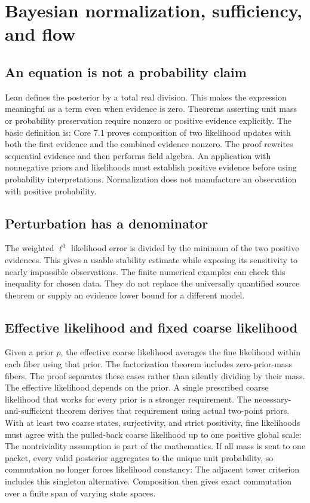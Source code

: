 \clearpage\section{Bayesian normalization, sufficiency, and flow}
\label{sec:bayes}
\subsection{An equation is not a probability claim}
Lean defines the posterior by a total real division. This makes the expression meaningful as a term even when evidence is zero. Theorems asserting unit mass or probability preservation require nonzero or positive evidence explicitly. The basic definition is:
Core 7.1 proves composition of two likelihood updates with both the first evidence and the combined evidence nonzero. The proof rewrites sequential evidence and then performs field algebra.
An application with nonnegative priors and likelihoods must establish positive evidence before using probability interpretations. Normalization does not manufacture an observation with positive probability.

\subsection{Perturbation has a denominator}
The weighted $\ell^1$ likelihood error is divided by the minimum of the two positive evidences. This gives a usable stability estimate while exposing its sensitivity to nearly impossible observations.
The finite numerical examples can check this inequality for chosen data. They do not replace the universally quantified source theorem or supply an evidence lower bound for a different model.

\subsection{Effective likelihood and fixed coarse likelihood}
Given a prior $p$, the effective coarse likelihood averages the fine likelihood within each fiber using that prior. The factorization theorem includes zero-prior-mass fibers. The proof separates these cases rather than silently dividing by their mass.
The effective likelihood depends on the prior. A single prescribed coarse likelihood that works for every prior is a stronger requirement. The necessary-and-sufficient theorem derives that requirement using actual two-point priors. With at least two coarse states, surjectivity, and strict positivity, fine likelihoods must agree with the pulled-back coarse likelihood up to one positive global scale:
The nontriviality assumption is part of the mathematics. If all mass is sent to one packet, every valid posterior aggregates to the unique unit probability, so commutation no longer forces likelihood constancy:
The adjacent tower criterion includes this singleton alternative. Composition then gives exact commutation over a finite span of varying state spaces.

